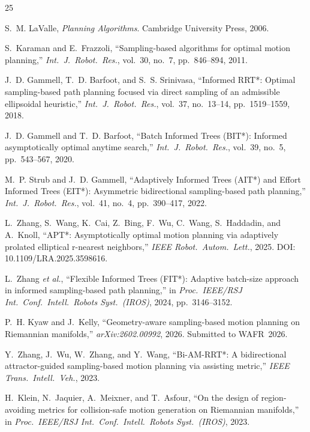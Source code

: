 \documentclass[journal]{IEEEtran}
\begin{document}
\balance

\begin{thebibliography}{25}

S.~M. LaValle, \emph{Planning Algorithms}.
Cambridge University Press, 2006.

S.~Karaman and E.~Frazzoli,
``Sampling-based algorithms for optimal motion planning,''
\emph{Int.\ J.\ Robot.\ Res.}, vol.~30, no.~7, pp.~846--894, 2011.

J.~D. Gammell, T.~D. Barfoot, and S.~S. Srinivasa,
``Informed RRT*: Optimal sampling-based path planning focused via
direct sampling of an admissible ellipsoidal heuristic,''
\emph{Int.\ J.\ Robot.\ Res.}, vol.~37, no.~13--14, pp.~1519--1559, 2018.

J.~D. Gammell and T.~D. Barfoot,
``Batch Informed Trees (BIT*): Informed asymptotically optimal
anytime search,''
\emph{Int.\ J.\ Robot.\ Res.}, vol.~39, no.~5, pp.~543--567, 2020.

M.~P. Strub and J.~D. Gammell,
``Adaptively Informed Trees (AIT*) and Effort Informed Trees (EIT*):
Asymmetric bidirectional sampling-based path planning,''
\emph{Int.\ J.\ Robot.\ Res.}, vol.~41, no.~4, pp.~390--417, 2022.

L.~Zhang, S.~Wang, K.~Cai, Z.~Bing, F.~Wu, C.~Wang, S.~Haddadin,
and A.~Knoll,
``APT*: Asymptotically optimal motion planning via adaptively
prolated elliptical r-nearest neighbors,''
\emph{IEEE Robot.\ Autom.\ Lett.}, 2025.
DOI: 10.1109/LRA.2025.3598616.

L.~Zhang \emph{et al.},
``Flexible Informed Trees (FIT*): Adaptive batch-size approach in
informed sampling-based path planning,''
in \emph{Proc.\ IEEE/RSJ Int.\ Conf.\ Intell.\ Robots Syst.\ (IROS)},
2024, pp.~3146--3152.

P.~H. Kyaw and J.~Kelly,
``Geometry-aware sampling-based motion planning on Riemannian
manifolds,''
\emph{arXiv:2602.00992}, 2026.
Submitted to WAFR~2026.

Y.~Zhang, J.~Wu, W.~Zhang, and Y.~Wang,
``Bi-AM-RRT*: A bidirectional attractor-guided sampling-based motion
planning via assisting metric,''
\emph{IEEE Trans.\ Intell.\ Veh.}, 2023.

H.~Klein, N.~Jaquier, A.~Meixner, and T.~Asfour,
``On the design of region-avoiding metrics for collision-safe motion
generation on Riemannian manifolds,''
in \emph{Proc.\ IEEE/RSJ Int.\ Conf.\ Intell.\ Robots Syst.\ (IROS)},
2023.


\end{thebibliography}
\end{document}
